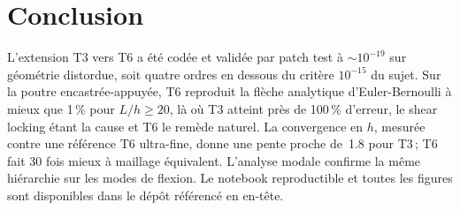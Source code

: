 \documentclass[a4paper,10pt]{article}
\begin{document}
\section{Conclusion}

L'extension T3 vers T6 a été codée et validée par patch test à
$\sim 10^{-19}$ sur géométrie distordue, soit quatre ordres en dessous
du critère $10^{-15}$ du sujet. Sur la poutre encastrée-appuyée, T6
reproduit la flèche analytique d'Euler-Bernoulli à mieux que 1\,\% pour
$L/h\geq 20$, là où T3 atteint près de 100\,\% d'erreur, le shear
locking étant la cause et T6 le remède naturel. La convergence en $h$,
mesurée contre une référence T6 ultra-fine, donne une pente proche
de~1.8 pour T3\,; T6 fait 30 fois mieux à maillage équivalent.
L'analyse modale confirme la même hiérarchie sur les modes de flexion.
Le notebook reproductible et toutes les figures sont disponibles dans
le dépôt référencé en en-tête.
\end{document}
